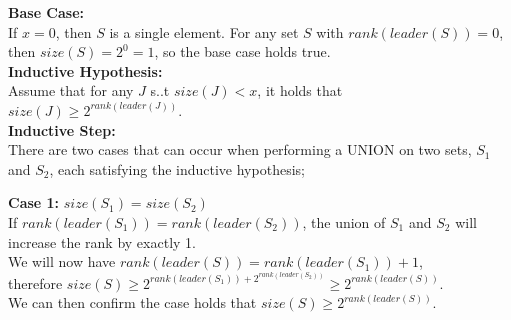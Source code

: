 \documentclass{article}
\begin{document}
\begin{enumerate}
\textbf{Base Case:} \\
If $x=0$, then $S$ is a single element. For any set $S$ with $rank(leader(S)) = 0$, then $size(S) = 2^0 = 1$, so the base case holds true. \\

\textbf{Inductive Hypothesis:} \\
Assume that for any $J$ s..t $size(J) < x$, it holds that $size(J) \geq 2^{rank(leader(J))}$. \\

\textbf{Inductive Step:} \\
There are two cases that can occur when performing a UNION on two sets, $S_1$ and $S_2$, each satisfying the inductive hypothesis; 

\textbf{Case 1: } $size(S_1) = size(S_2)$ \\
If $rank(leader(S_1)) = rank(leader(S_2))$, the union of $S_1$ and $S_2$ will increase the rank by exactly 1. \\
\newline 
We will now have $rank(leader(S)) = rank(leader(S_1)) + 1$, \\
therefore $size(S) \geq 2^{rank(leader(S_1)) + 2^{rank(leader(S_2))}} \geq 2^{rank(leader(S))}$. \\
\newline
We can then confirm the case holds that $size(S) \geq 2^{rank(leader(S))}$. \\


\end{enumerate}
\end{document}
